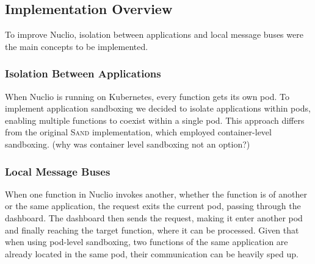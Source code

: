 \subsection{Implementation Overview}
To improve Nuclio, isolation between applications and local message buses were the main concepts to be implemented.

\subsubsection{Isolation Between Applications}
When Nuclio is running on Kubernetes, every function gets its own pod. To implement application sandboxing we decided to isolate applications within pods, enabling multiple
 functions to coexist within a single pod. This approach differs from the original \textsc{Sand} implementation, which employed container-level sandboxing.  
 (why was container level sandboxing not an option?)


\subsubsection{Local Message Buses}
When one function in Nuclio invokes another, whether the function is of another or the same application, the request exits the current pod, passing through the dashboard. 
The dashboard then sends the request, making it enter another pod and finally reaching the target function, where it can be processed. Given that when using pod-level sandboxing, 
two functions of the same application are already located in the same pod, their communication can be heavily sped up.



\cite{akkus2018sand}